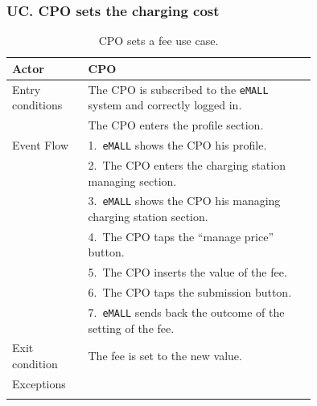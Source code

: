 \subsubsection*{UC\cuc . CPO sets the charging cost}
\begin{center}
    \begin{longtable}{lp{0.75\linewidth}}
        \hline
        Actor            & CPO                                                                       \\
        \hline
        Entry conditions & The CPO is subscribed to the \verb|eMALL| system and correctly logged in. \\
        & The CPO enters the profile section.                                       \\
        \hline
        Event Flow       & 1.\ \verb|eMALL| shows the CPO his profile.                               \\
        & 2.\ The CPO enters the charging station managing section.                 \\
        & 3.\ \verb|eMALL| shows the CPO his managing charging station section.     \\
        & 4.\ The CPO taps the ``manage price'' button.                             \\
        & 5.\ The CPO inserts the value of the fee.                                 \\
        & 6.\ The CPO taps the submission button.                                   \\
        & 7.\ \verb|eMALL| sends back the outcome of the setting of the fee.        \\
        \hline
        Exit condition   & The fee is set to the new value.                                          \\
        \hline
        Exceptions       &                                                                           \\
        \hline
        \caption{CPO sets a fee use case.}
        \label{tab: CPO_sets_fee_use_case}
    \end{longtable}


\end{center}
